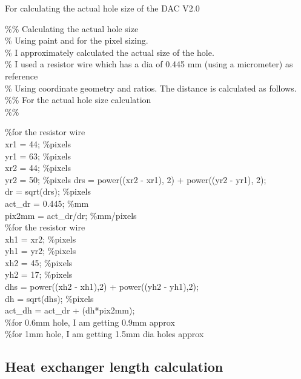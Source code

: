 \begin{appendices}
    For calculating the actual hole size of the DAC V2.0 \bigbreak
    
    {\selectfont
    
    \%\% Calculating the actual hole size \\

    \% Using paint and for the pixel sizing. \\
    \% I approximately calculated the actual size of the hole. \\
    \% I used a resistor wire which has a dia of 0.445 mm (using a micrometer) as reference \\
    \% Using coordinate geometry and ratios. The distance is calculated as follows. \\

    \%\% For the actual hole size calculation \\
    \%\% 

    \%for the resistor wire \\
    xr1 = 44; \%pixels \\
    yr1 = 63; \%pixels \\
    xr2 = 44; \%pixels \\
    yr2 = 50; \%pixels 
    drs = power((xr2 - xr1), 2) + power((yr2 - yr1), 2); \\
    dr = sqrt(drs); \%pixels \\
    act\_dr = 0.445; \%mm \\
    pix2mm = act\_dr/dr; \%mm/pixels \\

    \%for the resistor wire \\
    xh1 = xr2; \%pixels \\
    yh1 = yr2; \%pixels \\
    xh2 = 45; \%pixels \\
    yh2 = 17; \%pixels \\
    dhs = power((xh2 - xh1),2) + power((yh2 - yh1),2); \\
    dh = sqrt(dhs); \%pixels \\
    act\_dh = act\_dr + (dh*pix2mm); \\

    \%for 0.6mm hole, I am getting 0.9mm approx \\
    \%for 1mm hole, I am getting 1.5mm dia holes approx \\
    }
    
\subsection{Heat exchanger length calculation}



\end{appendices}
